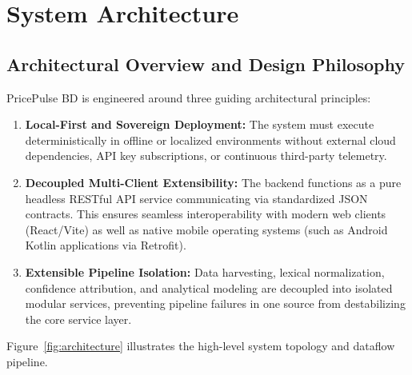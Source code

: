 \chapter{System Architecture}
\label{ch:system_architecture}

\section{Architectural Overview and Design Philosophy}
PricePulse BD is engineered around three guiding architectural principles:
\begin{enumerate}
    \item \textbf{Local-First and Sovereign Deployment:} The system must execute deterministically in offline or localized environments without external cloud dependencies, API key subscriptions, or continuous third-party telemetry.
    \item \textbf{Decoupled Multi-Client Extensibility:} The backend functions as a pure headless RESTful API service communicating via standardized JSON contracts. This ensures seamless interoperability with modern web clients (React/Vite) as well as native mobile operating systems (such as Android Kotlin applications via Retrofit).
    \item \textbf{Extensible Pipeline Isolation:} Data harvesting, lexical normalization, confidence attribution, and analytical modeling are decoupled into isolated modular services, preventing pipeline failures in one source from destabilizing the core service layer.
\end{enumerate}

Figure~\ref{fig:architecture} illustrates the high-level system topology and dataflow pipeline.

